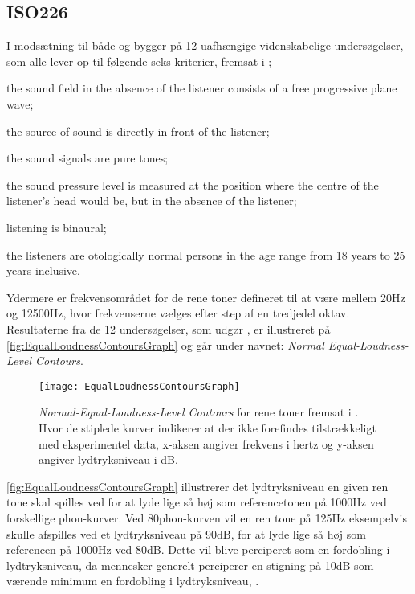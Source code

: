 \subsection{ISO226}
\label{ISO226}
%
I modsætning til både \textcite{PDF:FletcherMunson} og \textcite{PDF:RobinsonDadson} bygger \textcite[s. 9]{STD:ISO226} på 12 uafhængige videnskabelige undersøgelser, som alle lever op til følgende seks kriterier, fremsat i \textcite[s. 1]{STD:ISO226};
\blankline
\begin{alpherate}
  \item the sound field in the absence of the listener consists of a free progressive plane wave;
  \item the source of sound is directly in front of the listener;
  \item the sound signals are pure tones;
  \item the sound pressure level is measured at the position where the centre of the listener's head would be, but in the absence of the listener;
  \item listening is binaural;
  \item the listeners are otologically normal persons in the age range from 18 years to 25 years inclusive.
\end{alpherate}
\blankline
\noindent
%
Ydermere er frekvensområdet for de rene toner defineret til at være mellem 20Hz og 12500Hz, hvor frekvenserne vælges efter step af en tredjedel oktav. Resultaterne fra de 12 undersøgelser, som udgør \textcite{STD:ISO226}, er illustreret på \autoref{fig:EqualLoudnessContoursGraph} og går under navnet: \textit{Normal Equal-Loudness-Level Contours}.
%
\newpage
\noindent 
%
\begin{figure}[H]
	\centering
	\texttt{[image: EqualLoudnessContoursGraph]}
	\caption{\textit{Normal-Equal-Loudness-Level Contours} for rene toner fremsat i \textcite[s. 5]{STD:ISO226}. Hvor de stiplede kurver indikerer at der ikke forefindes tilstrækkeligt med eksperimentel data, x-aksen angiver frekvens i hertz og y-aksen angiver lydtryksniveau i dB.}
	\label{fig:EqualLoudnessContoursGraph}
\end{figure}
\noindent
%
\autoref{fig:EqualLoudnessContoursGraph} illustrerer det lydtryksniveau en given ren tone skal spilles ved for at lyde lige så høj som referencetonen på 1000Hz ved forskellige phon-kurver. Ved 80phon-kurven vil en ren tone på 125Hz eksempelvis skulle afspilles ved et lydtryksniveau på 90dB, for at lyde lige så høj som referencen på 1000Hz ved 80dB. Dette vil blive perciperet som en fordobling i lydtryksniveau, da mennesker generelt perciperer en stigning på 10dB som værende minimum en fordobling i lydtryksniveau, \parencite{PDF:Music175Loudness}.\\

